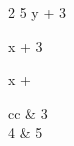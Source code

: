 \newcommand{\abc}{5}
\newcommand{\xyz}[2][x]{%
#1 + #2%
}
\renewcommand{%
\phi%
}{%
\theta%
}
\newcommand{\aaa}{\b{2}}
\renewcommand{\phi}{\aaa}
\newcommand{\b}[1]{#1}

\newenvironment{ary}
{\begin{array}{cc}
\hline}
{\hline
\end{array}}

\phi
\abc
\xyz[y] {3}
\xyz 3
\xyz \alpha

\begin{ary}
2 & 3\\
4 & 5
\end{ary}
